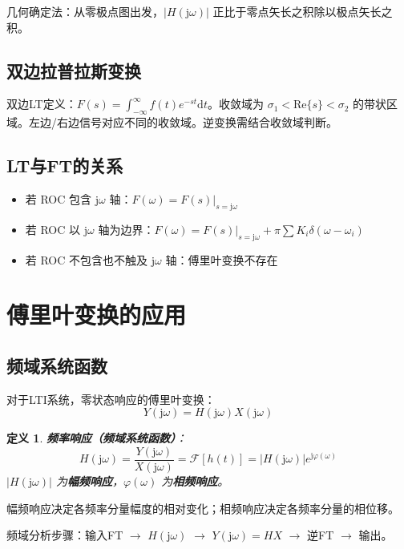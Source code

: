 \documentclass[11pt,a4paper]{ctexart}
\newtheorem{definition}{定义}[section]
\newcommand{\FT}{\mathcal{F}}           %
\newcommand{\jj}{\mathrm{j}}            %
\newcommand{\dd}{\mathrm{d}}            %
\newcommand{\dirac}{\delta}             %
\begin{document}
几何确定法：从零极点图出发，$|H(\jj\omega)|$ 正比于零点矢长之积除以极点矢长之积。

\subsection{双边拉普拉斯变换}

双边LT定义：$F(s) = \int_{-\infty}^{\infty} f(t)e^{-st}\dd t$。收敛域为 $\sigma_1 < \mathrm{Re}\{s\} < \sigma_2$ 的带状区域。左边/右边信号对应不同的收敛域。逆变换需结合收敛域判断。

\subsection{LT与FT的关系}

\begin{itemize}
    \item 若 ROC 包含 $\jj\omega$ 轴：$F(\omega) = F(s)|_{s=\jj\omega}$
    \item 若 ROC 以 $\jj\omega$ 轴为边界：$F(\omega) = F(s)|_{s=\jj\omega} + \pi\sum K_i\dirac(\omega - \omega_i)$
    \item 若 ROC 不包含也不触及 $\jj\omega$ 轴：傅里叶变换不存在
\end{itemize}

\newpage
\section{傅里叶变换的应用}

\subsection{频域系统函数}

对于LTI系统，零状态响应的傅里叶变换：
\[
Y(\jj\omega) = H(\jj\omega)X(\jj\omega)
\]

\begin{definition}
\textbf{频率响应（频域系统函数）}：
\[
H(\jj\omega) = \frac{Y(\jj\omega)}{X(\jj\omega)} = \FT[h(t)] = |H(\jj\omega)|e^{\jj\varphi(\omega)}
\]
$|H(\jj\omega)|$ 为\textbf{幅频响应}，$\varphi(\omega)$ 为\textbf{相频响应}。
\end{definition}

幅频响应决定各频率分量幅度的相对变化；相频响应决定各频率分量的相位移。

频域分析步骤：输入FT $\to$ $H(\jj\omega)$ $\to$ $Y(\jj\omega) = HX$ $\to$ 逆FT $\to$ 输出。
\end{document}
